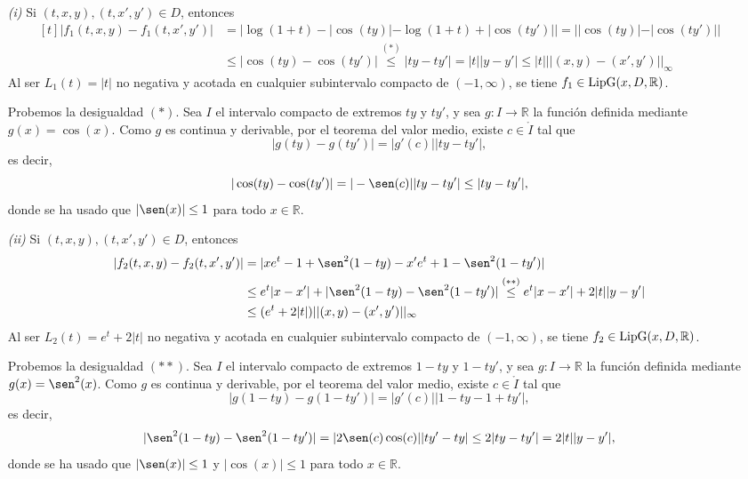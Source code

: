 \documentclass[11pt]{report}
\newcommand{\R}{\mathbb R}
\begin{document}
\begin{itemize}
    \item[\textit{(i)}] Si $(t,x,y),(t,x',y') \in D$, entonces
\[
\begin{aligned}[t]
    |f_1(t,x,y)-f_1(t,x',y')|&=|\log(1+t)-|\cos(ty)|-\log(1+t)+|\cos(ty')|| =||\cos(ty)|-|\cos(ty')|| \\
    &\leq |\cos(ty)-\cos(ty')| \overset{(\ast)}{\leq} |ty-ty'|=|t||y-y'|\leq |t| ||(x,y)-(x',y')||_{\infty}
\end{aligned}
\]
Al ser $L_1(t)=|t|$ no negativa y acotada en cualquier subintervalo compacto de $(-1,\infty)$, se tiene $f_1 \in \textup{LipG}(x,D,\R)$. 

\vspace{2mm}

Probemos la desigualdad $(\ast)$. Sea $I$ el intervalo compacto de extremos $ty$ y $ty'$, y sea $g \colon I \to \R$ la función definida mediante $g(x)=\cos(x)$. Como $g$ es continua y derivable, por el teorema del valor medio, existe $c \in \mathring{I}$ tal que
\[|g(ty)-g(ty')|=|g'(c)||ty-ty'|,\]
es decir,
\[|\cos(ty)-\cos(ty')|=|-\sen(c)||ty-ty'| \leq |ty-ty'|,\]
donde se ha usado que $|\sen(x)| \leq 1$ para todo $x \in \R$.
\item[\textit{(ii)}] Si $(t,x,y),(t,x',y') \in D$, entonces
\[
\begin{aligned}[t]
    |f_2(t,x,y)-f_2(t,x',y')|&=|xe^t-1+\sen^2(1-ty)-x'e^t+1-\sen^2(1-ty')| \\
    &\leq e^t|x-x'|+|\sen^2(1-ty)-\sen^2(1-ty')| \overset{(\ast\ast)}{\leq} e^t|x-x'|+2|t||y-y'| \\
    &\leq (e^t+2|t|)||(x,y)-(x',y')||_{\infty}
\end{aligned}
\]
Al ser $L_2(t)=e^t+2|t|$ no negativa y acotada en cualquier subintervalo compacto de $(-1,\infty)$, se tiene $f_2 \in \textup{LipG}(x,D,\R)$. 

\vspace{2mm}

Probemos la desigualdad $(\ast\ast)$. Sea $I$ el intervalo compacto de extremos $1-ty$ y $1-ty'$, y sea $g \colon I \to \R$ la función definida mediante $g(x)=\sen^2(x)$. Como $g$ es continua y derivable, por el teorema del valor medio, existe $c \in \mathring{I}$ tal que
\[|g(1-ty)-g(1-ty')|=|g'(c)||1-ty-1+ty'|,\]
es decir,
\[|\sen^2(1-ty)-\sen^2(1-ty')|=|2\sen(c)\cos(c)||ty'-ty| \leq 2|ty-ty'|=2|t||y-y'|,\]
donde se ha usado que $|\sen(x)| \leq 1$ y $|\cos(x)| \leq 1$ para todo $x \in \R$.
\end{itemize}
\end{document}
